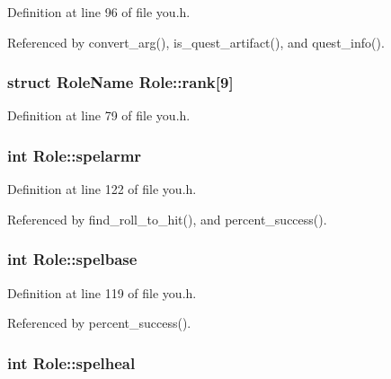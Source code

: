 Definition at line 96 of file you.\+h.



Referenced by convert\+\_\+arg(), is\+\_\+quest\+\_\+artifact(), and quest\+\_\+info().

\hypertarget{structRole_a77d60a3978eff3814dc2403dbf15c38d}{
\subsubsection[{rank}]{\setlength{\rightskip}{0pt plus 5cm}struct {\bf Role\+Name} Role\+::rank\mbox{[}9\mbox{]}}}\label{structRole_a77d60a3978eff3814dc2403dbf15c38d}


Definition at line 79 of file you.\+h.

\hypertarget{structRole_ad8ed198d77085f02936e9acc576588c8}{
\subsubsection[{spelarmr}]{\setlength{\rightskip}{0pt plus 5cm}int Role\+::spelarmr}}\label{structRole_ad8ed198d77085f02936e9acc576588c8}


Definition at line 122 of file you.\+h.



Referenced by find\+\_\+roll\+\_\+to\+\_\+hit(), and percent\+\_\+success().

\hypertarget{structRole_a419bd7e1a3ef7270cede02614de91119}{
\subsubsection[{spelbase}]{\setlength{\rightskip}{0pt plus 5cm}int Role\+::spelbase}}\label{structRole_a419bd7e1a3ef7270cede02614de91119}


Definition at line 119 of file you.\+h.



Referenced by percent\+\_\+success().

\hypertarget{structRole_a2f0221b5b961d1898eba6d6e5d19d5c2}{
\subsubsection[{spelheal}]{\setlength{\rightskip}{0pt plus 5cm}int Role\+::spelheal}}\label{structRole_a2f0221b5b961d1898eba6d6e5d19d5c2}


